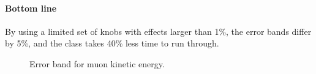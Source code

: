 \documentclass[12pt,a4paper,final]{iopart}
\begin{document}
\paragraph{Bottom line} By using a limited set of knobs with effects larger than 1\%, the error bands differ by 5\%, and the class takes 40\% less time to run through.

\begin{figure}[h]
  \centering
  \hfill
  \caption{Error band for muon kinetic energy.}
\end{figure}
\end{document}
